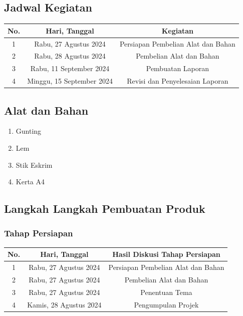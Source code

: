 \documentclass[a4paper,12pt, bahasa]{article}
\begin{document}
 \subsection{Jadwal Kegiatan}
 \begin{table}[ht]
     \centering
     \begin{tabular}{|c|c|c|}
     \hline
     \rowcolor[HTML]{9B9B9B}
         No. & Hari, Tanggal  & Kegiatan \\ \hline
         1 & Rabu, 27 Agustus 2024  & Persiapan Pembelian Alat dan Bahan \\ \hline
         2 & Rabu, 28 Agustus 2024 & Pembelian Alat dan Bahan \\ \hline
         3 & Rabu, 11 September 2024 & Pembuatan Laporan\\ \hline
         4 & Minggu, 15 September 2024 & Revisi dan Penyelesaian Laporan\\ \hline
     \end{tabular}
 \end{table}
 \subsection{Alat dan Bahan}
 \begin{enumerate}
     \item Gunting
     \item Lem
     \item Stik Eskrim
     \item Kerta A4
 \end{enumerate}
 \subsection{Langkah Langkah Pembuatan Produk}
 \subsubsection{Tahap Persiapan}
 
 \begin{table}[ht]
     \centering
     \begin{tabular}{|c|c|c|}
     \hline
     \rowcolor[HTML]{9B9B9B}
         No. & Hari, Tanggal  & Hasil Diskusi Tahap Persiapan \\ \hline
         1 & Rabu, 27 Agustus 2024  & Persiapan Pembelian Alat dan Bahan \\ \hline
         2 & Rabu, 27 Agustus 2024 & Pembelian Alat dan Bahan \\ \hline
         3 & Rabu, 27 Agustus 2024 & Penentuan Tema\\ \hline
         4 & Kamis, 28 Agustus 2024 & Pengumpulan Projek\\ \hline
     \end{tabular}
 \end{table}
\end{document}
